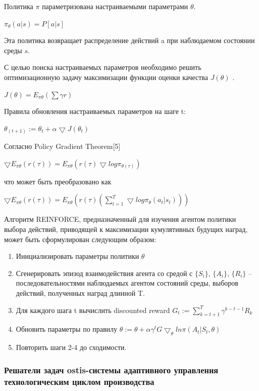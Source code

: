 Политика $\pi$ параметризована настраиваемыми параметрами $\theta$.

$\pi_{\theta} (a|s)= P[a|s]$

Эта политика возвращает распределение действий a при наблюдаемом состоянии среды $s$.

С целью поиска настраиваемых параметров необходимо решить оптимизационную задачу максимизации функции оценки качества $J( \theta )$ .

$J( \theta )=E_{ \pi  \theta } ( \sum  \gamma r)$

Правила обновления настраиваемых параметров на шаге t:

$\theta _{(t+1)} := \theta _{t}+ \alpha  \bigtriangledown J( \theta _t)$


Согласно Policy Gradient Theorem[5]

$\bigtriangledown E_{ \pi  \theta } (r( \tau ) )=E_{ \pi  \theta } (r( \tau ) \bigtriangledown log \pi _{ \theta  ( \tau )})$


что может быть преобразовано как

$\bigtriangledown E_{ \pi  \theta } (r( \tau ) )=E_{ \pi  \theta } (r( \tau )( \sum_{t=1}^{T}  \bigtriangledown log  \pi _{ \theta } (a_t |s_t)))$


Алгоритм REINFORCE, предназначенный для изучения агентом политики выбора действий, приводящей к максимизации кумулятивных будущих наград, может быть сформулирован следующим образом\cite{Sutton1998}:

\begin{enumerate}
    \item Инициализировать параметры политики $\theta$
    \item Сгенерировать эпизод взаимодействия агента со средой с $\{S_i \}$, $\{A_i \}$, $\{R_i \}$   – последовательностями наблюдаемых агентом состояний среды, выборов действий, полученных наград длинной T.
    \item Для каждого шага t вычислить discounted reward $G_t :=  \sum_{k=t+1}^{T}   \gamma ^{k-t-1} R_k  $
    \item Обновить параметры по правилу $\theta :=  \theta + \alpha  \gamma ^t G \bigtriangledown_ \theta  ln \pi (A_t |S_t, \theta )$
    \item Повторить шаги 2-4 до сходимости.


\end{enumerate}


\subsubsection{Решатели задач ostis-системы адаптивного управления технологическим циклом производства}

